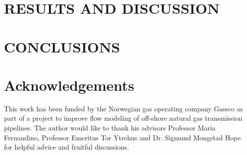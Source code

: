 \documentclass{mekit17}
\begin{document}
\section{RESULTS AND DISCUSSION}
\label{results}


\section{CONCLUSIONS}
\label{conclusion}


\section*{Acknowledgements}
This work has been funded by the Norwegian gas operating company Gassco as part of a project to improve flow modeling of off-shore natural gas transmission pipelines. The author would like to thank his advisors Professor Maria Fernandino, Professor Emeritus Tor Ytrehus and Dr. Sigmund Mongstad Hope for helpful advice and fruitful discussions.

\printbibliography
\end{document}
